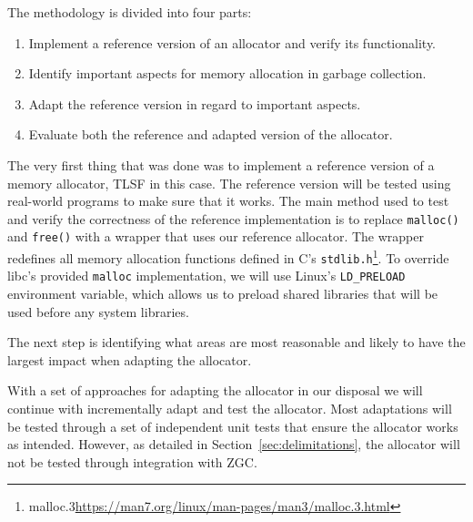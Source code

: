 

The methodology is divided into four parts:

\begin{enumerate}
    \item Implement a reference version of an allocator and verify its functionality.
    \item Identify important aspects for memory allocation in garbage collection.
    \item Adapt the reference version in regard to important aspects.
    \item Evaluate both the reference and adapted version of the allocator.
\end{enumerate}

The very first thing that was done was to implement a reference version of a memory allocator, TLSF in this case. The reference version will be tested using real-world programs to make sure that it works. The main method used to test and verify the correctness of the reference implementation is to replace \texttt{malloc()} and \texttt{free()} with a wrapper that uses our reference allocator. The wrapper redefines all memory allocation functions defined in C's \texttt{stdlib.h}\footnote{malloc.3\url{https://man7.org/linux/man-pages/man3/malloc.3.html}}. To override libc's provided \texttt{malloc} implementation, we will use Linux's \texttt{LD\_PRELOAD} environment variable, which allows us to preload shared libraries that will be used before any system libraries.

The next step is identifying what areas are most reasonable and likely to have the largest impact when adapting the allocator.

With a set of approaches for adapting the allocator in our disposal we will continue with incrementally adapt and test the allocator. Most adaptations will be tested through a set of independent unit tests that ensure the allocator works as intended. However, as detailed in Section~\ref{sec:delimitations}, the allocator will not be tested through integration with ZGC.


